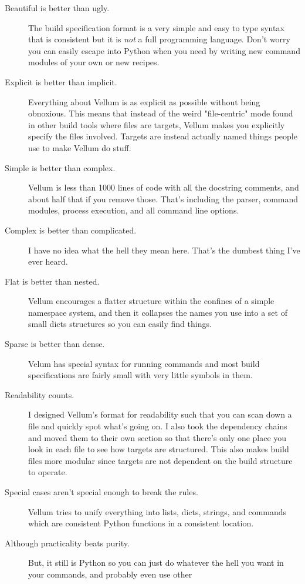 \begin{description}
\item [Beautiful is better than ugly.]  The build specification format is a very
simple and easy to type syntax that is consistent but it is \emph{not} a full
programming language.  Don't worry you can easily escape into Python when you
need by writing new command modules of your own or new recipes.
\item [Explicit is better than implicit.]  Everything about Vellum is as
explicit as possible without being obnoxious.  This means that instead of the
weird "file-centric" mode found in other build tools where files are targets,
Vellum makes you explicitly specify the files involved.  Targets are instead
actually named things people use to make Vellum do stuff.
\item [Simple is better than complex.]  Vellum is less than 1000 lines of code
with all the docstring comments, and about half that if you remove those.
That's including the parser, command modules, process execution, and all command
line options.
\item [Complex is better than complicated.]  I have no idea what the hell they
mean here.  That's the dumbest thing I've ever heard.
\item [Flat is better than nested.]  Vellum encourages a flatter structure
within the confines of a simple namespace system, and then it collapses the
names you use into a set of small dicts structures so you can easily find
things.
\item [Sparse is better than dense.]  Velum has special syntax for running
commands and most build specifications are fairly small with very little symbols
in them.
\item [Readability counts.]  I designed Vellum's format for readability such
that you can scan down a file and quickly spot what's going on.  I also took the
dependency chains and moved them to their own section so that there's only one
place you look in each file to see how targets are structured.  This also makes
build files more modular since targets are not dependent on the build structure
to operate.
\item [Special cases aren't special enough to break the rules.]  Vellum tries to
unify everything into lists, dicts, strings, and commands which are consistent
Python functions in a consistent location.
\item [Although practicality beats purity.]  But, it still is Python so you can
just do whatever the hell you want in your commands, and probably even use other

\end{description}
